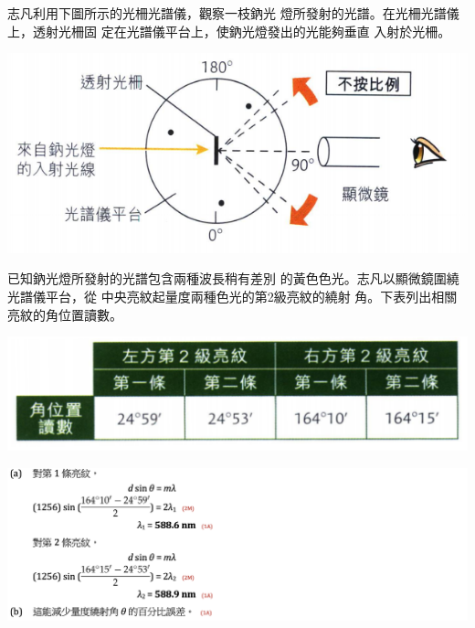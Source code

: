 {
    志凡利用下圖所示的光柵光譜儀，觀察一枝鈉光 燈所發射的光譜。在光柵光譜儀上，透射光柵固 定在光譜儀平台上，使鈉光燈發出的光能夠垂直 入射於光柵。
    \par{\par\centering\includegraphics[width=.45\textwidth]{./img/ch4_earlyclass_wave_lq_2024-05-14-14-19-01.png}\par}
    已知鈉光燈所發射的光譜包含兩種波長稍有差別 的黃色色光。志凡以顯微鏡圍繞光譜儀平台，從 中央亮紋起量度兩種色光的第2級亮紋的繞射 角。下表列出相關亮紋的角位置讀數。
    \par{\par\centering\includegraphics[width=.6\textwidth]{./img/ch4_earlyclass_wave_lq_2024-05-14-14-22-31.png}\par}
    \clearpage
}{
    \sol\par{\par\centering\includegraphics[width=\textwidth]{./img/ch4_earlyclass_wave_lq_2024-05-14-14-24-55.png}\par}
}


